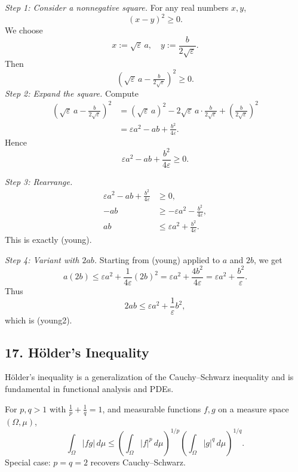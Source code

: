 \emph{Step 1: Consider a nonnegative square.}
For any real numbers $x,y$,
\[
    (x-y)^2 \ge 0.
\]
We choose
\[
    x := \sqrt{\varepsilon}\,a,
    \quad
    y := \frac{b}{2\sqrt{\varepsilon}}.
\]
Then
\[
    (\sqrt{\varepsilon}\,a - \tfrac{b}{2\sqrt{\varepsilon}})^2 \ge 0.
\]
\emph{Step 2: Expand the square.}
Compute
\begin{align*}
    (\sqrt{\varepsilon}\,a - \tfrac{b}{2\sqrt{\varepsilon}})^2 & = (\sqrt{\varepsilon}\,a)^2 -2\sqrt{\varepsilon}\,a \cdot \frac{b}{2\sqrt{\varepsilon}} + \left(\frac{b}{2\sqrt{\varepsilon}}\right)^2 \\
                                                               & =\varepsilon a^2 - ab + \frac{b^2}{4\varepsilon}.
\end{align*}
Hence
\[
    \varepsilon a^2 - ab + \frac{b^2}{4\varepsilon} \ge 0.
\]

\emph{Step 3: Rearrange.}
\begin{align*}
    \varepsilon a^2 - ab + \frac{b^2}{4\varepsilon} & \ge 0,                                           \\
    -ab                                             & \ge -\varepsilon a^2 - \frac{b^2}{4\varepsilon}, \\
    ab                                              & \le \varepsilon a^2 + \frac{b^2}{4\varepsilon}.
\end{align*}
This is exactly (young).

\emph{Step 4: Variant with $2ab$.}
Starting from (young) applied to $a$ and $2b$, we get
\[
    a(2b) \le \varepsilon a^2 + \frac{1}{4\varepsilon}(2b)^2 = \varepsilon a^2 + \frac{4b^2}{4\varepsilon} = \varepsilon a^2 + \frac{b^2}{\varepsilon}.
\]
Thus
\[
    2ab \le \varepsilon a^2 + \frac{1}{\varepsilon} b^2,
\]
which is (young2).

\subsection*{17. Hölder's Inequality}
Hölder's inequality is a generalization of the Cauchy--Schwarz inequality and is fundamental in functional analysis and PDEs.

For $p,q > 1$ with $\frac{1}{p} + \frac{1}{q} = 1$, and measurable functions $f,g$ on a measure space $(\Omega,\mu)$,
\[
    \int_\Omega |f g| \, d\mu \le \left( \int_\Omega |f|^p \, d\mu \right)^{1/p} \left( \int_\Omega |g|^q \, d\mu \right)^{1/q}.
\]
Special case: $p=q=2$ recovers Cauchy--Schwarz.
